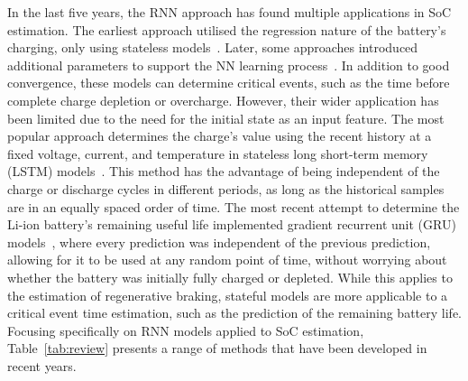 % 
In the last five years, the RNN approach has found multiple applications in SoC estimation.
The earliest approach utilised the regression nature of the battery's charging, only using stateless models~\cite{song_lithium-ion_2018,jiao_gru-rnn_2020,xiao_accurate_2019}.
Later, some approaches introduced additional parameters to support the NN learning process~\cite{mamo_long_2020,jiao_gru-rnn_2020,javid_adaptive_2020}.
In addition to good convergence, these models can determine critical events, such as the time before complete charge depletion or overcharge.
However, their wider application has been limited due to the need for the initial state as an input feature.
The most popular approach determines the charge's value using the recent history at a fixed voltage, current, and temperature in stateless long short-term memory (LSTM) models~\cite{Chemali2017,mamo_long_2020,javid_adaptive_2020,zhang_deep_2020}.
This method has the advantage of being independent of the charge or discharge cycles in different periods, as long as the historical samples are in an equally spaced order of time.
The most recent attempt to determine the Li-ion battery's remaining useful life  implemented gradient recurrent unit (GRU) models~\cite{song_lithium-ion_2018,javid_adaptive_2020,xiao_accurate_2019,jiao_gru-rnn_2020}, where every prediction was independent of the previous prediction, allowing for it to be used at any random point of time, without worrying about whether the battery was initially fully charged or depleted.
While this applies to the estimation of regenerative braking, stateful models are more applicable to a critical event time estimation, such as the prediction of the remaining battery life.
Focusing specifically on RNN models applied to SoC estimation, \mbox{Table~\ref{tab:review}} presents a range of  methods that have been developed in recent years.

